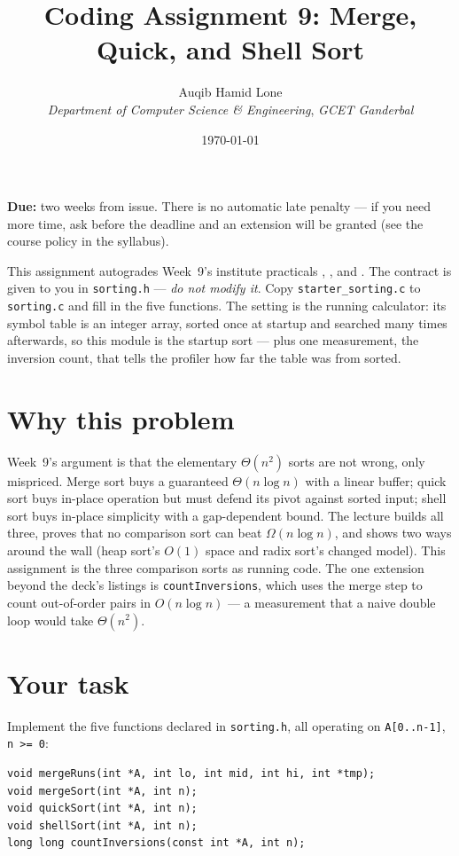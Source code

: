 \documentclass[11pt]{article}
\title{Coding Assignment 9: Merge, Quick, and Shell Sort}
\author{Auqib Hamid Lone\\[0.3em]
  \emph{Department of Computer Science \& Engineering}, \emph{GCET Ganderbal}}
\date{\today}
\begin{document}
\maketitle

\noindent\textbf{Due:} two weeks from issue. There is no automatic late penalty --- if you need more time, ask before the deadline and an extension will be granted (see the course policy in the syllabus).

\noindent This assignment autogrades Week~9's institute practicals , , and . The contract is given to you in \texttt{sorting.h} --- \emph{do not modify it}. Copy \texttt{starter\_sorting.c} to \texttt{sorting.c} and fill in the five functions. The setting is the running calculator: its symbol table is an integer array, sorted once at startup and searched many times afterwards, so this module is the startup sort --- plus one measurement, the inversion count, that tells the profiler how far the table was from sorted.

\section{Why this problem}

Week~9's argument is that the elementary $\Theta(n^2)$ sorts are not wrong, only mispriced. Merge sort buys a guaranteed $\Theta(n\log n)$ with a linear buffer; quick sort buys in-place operation but must defend its pivot against sorted input; shell sort buys in-place simplicity with a gap-dependent bound. The lecture builds all three, proves that no comparison sort can beat $\Omega(n\log n)$, and shows two ways around the wall (heap sort's $O(1)$ space and radix sort's changed model). This assignment is the three comparison sorts as running code. The one extension beyond the deck's listings is \texttt{countInversions}, which uses the merge step to count out-of-order pairs in $O(n\log n)$ --- a measurement that a naive double loop would take $\Theta(n^2)$.

\section{Your task}

Implement the five functions declared in \texttt{sorting.h}, all operating on \texttt{A[0..n-1]}, \texttt{n >= 0}:

\begin{verbatim}
void mergeRuns(int *A, int lo, int mid, int hi, int *tmp);
void mergeSort(int *A, int n);
void quickSort(int *A, int n);
void shellSort(int *A, int n);
long long countInversions(const int *A, int n);
\end{verbatim}
\end{document}
